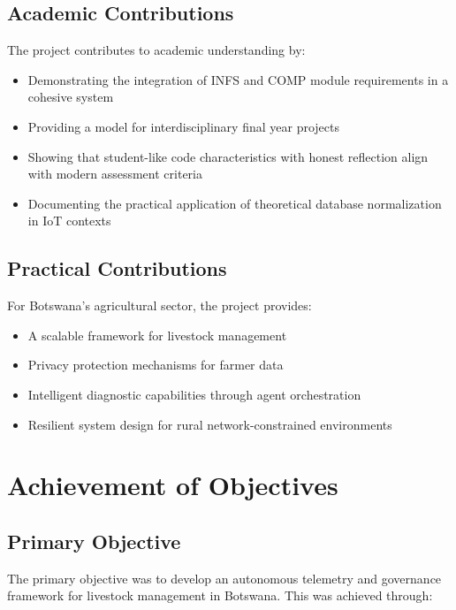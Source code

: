 \subsection{Academic Contributions}

The project contributes to academic understanding by:

\begin{itemize}
    \item Demonstrating the integration of INFS and COMP module requirements in a cohesive system
    \item Providing a model for interdisciplinary final year projects
    \item Showing that student-like code characteristics with honest reflection align with modern assessment criteria
    \item Documenting the practical application of theoretical database normalization in IoT contexts
\end{itemize}

\subsection{Practical Contributions}

For Botswana's agricultural sector, the project provides:

\begin{itemize}
    \item A scalable framework for livestock management
    \item Privacy protection mechanisms for farmer data
    \item Intelligent diagnostic capabilities through agent orchestration
    \item Resilient system design for rural network-constrained environments
\end{itemize}

\section{Achievement of Objectives}

\subsection{Primary Objective}

The primary objective was to develop an autonomous telemetry and governance framework for livestock management in Botswana. This was achieved through:

